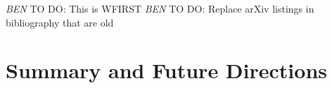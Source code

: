 \documentclass[12pt]{caltech_thesis}
\newcommand{\todo}[3]{{\color{#2} \emph{#1} TO DO: #3}}
\newcommand{\btmtodo}[1]{\todo{BEN}{red}{#1}}
\begin{document}
\btmtodo{This is WFIRST}
\btmtodo{Replace arXiv listings in bibliography that are old}

\chapter{Summary and Future Directions}
\label{chap:summary}





\printbibliography[]
%





\end{document}
